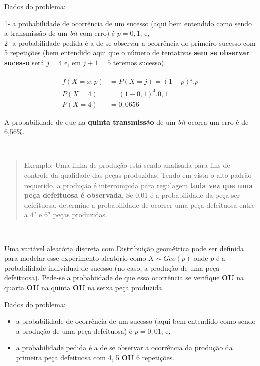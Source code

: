 \documentclass[
]{book}
\providecommand{\tightlist}{%
  \setlength{\itemsep}{0pt}\setlength{\parskip}{0pt}}
\begin{document}
\hfill\break

Dados do problema:

1- a probabilidade de ocorrência de um sucesso (aqui bem entendido como sendo a transmissão de um \emph{bit} com erro) é \(p=0,1\); e,\\
2- a probabilidade pedida é a de se observar a ocorrência do primeiro sucesso com 5 repetições (bem entendido aqui que o número de tentativas \textbf{sem se observar sucesso} será \(j=4\) e, em \(j+1=5\) teremos sucesso).

\hfill\break

\begin{align*}
f(X=x; p) & = P(X=j) = (1-p)^{j} .  p \\
P(X=4) & = (1-0,1)^{4} . 0,1 \\
P(X=4) & = 0,0656
\end{align*}

\hfill\break

A probabilidade de que na \textbf{quinta transmissão} de um \emph{bit} ocorra um erro é de 6,56\%.

~

\begin{quote}
Exemplo: Uma linha de produção está sendo analisada para fins de controle da qualidade das peças produzidas. Tendo em vista o alto padrão requerido, a produção é interrompida para regulagem \textbf{toda vez que uma peça defeituosa é observada}. Se 0,01 é a probabilidade da peça ser defeituosa, determine a probabilidade de ocorrer uma peça defeituosa entre a \(4^{a}\) e \(6^{a}\) peças produzidas.
\end{quote}

~

Uma variável aleatória discreta com Distribuição geométrica pode ser definida para modelar esse experimento aleatório como \(X\sim Geo(p)\) onde \(p\) é a probabilidade individual de sucesso (no caso, a produção de uma peça defeituosa). Pede-se a probabiidade de que essa ocorrência se verifique \textbf{OU} na quarta \textbf{OU} na quinta \textbf{OU} na setxa peça produzida.

\hfill\break

Dados do problema:

\begin{itemize}
\tightlist
\item
  a probabilidade de ocorrência de um sucesso (aqui bem entendido como sendo a produção de uma peça defeituosa) é \(p=0,01\); e,\\
\item
  a probabilidade pedida é a de se observar a ocorrência da produção da primeira peça defeituosa com 4, 5 \textbf{OU} 6 repetições.
\end{itemize}
\end{document}
